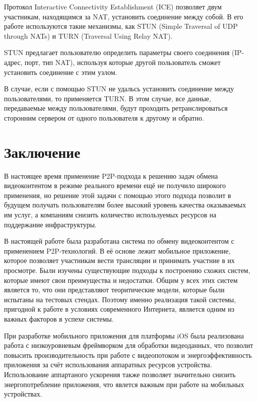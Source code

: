 		Протокол Interactive Connectivity Establishment (ICE) позволяет двум участникам, находящимся за NAT, установить
		соединение между собой. В его работе используются такие механизмы, как STUN (Simple Traversal of UDP
		through NATs) и TURN (Traversal Using Relay NAT).

		STUN предлагает пользователю определить параметры своего соединения (IP-адрес, порт, тип NAT), используя которые
		другой пользователь сможет установить соединение с этим узлом.

		В случае, если с помощью STUN не удальсь установить соединение между пользователями, то применяется TURN. В этом
		случае, все данные, передаваемые между пользователями, будут проходить ретранслироваться сторонним сервером от
		одного пользователя к другому и обратно.

\section*{Заключение}
	В настоящее время применение P2P-подхода к решению задач обмена видеоконтентом в режиме реального времени ещё не
	получило широкого применения, но решение этой задачи с помощью этого подхода позволит в будущем получать
	пользователям более высокий уровень качества оказываемых им услуг, а компаниям снизить количество используемых
	ресурсов на поддержание инфраструктуры.

	В настоящей работе была разработана система по обмену видеоконтентом с применением P2P-технологий. В её основе лежит
	мобильное приложение, которое позволяет участникам вести трансляции и принимать участние в их просмотре. Были
	изучены существующие подходы к построению схожих систем, которые имеют свои преимущества и недостатки. Общим у всех
	этих систем является то, что они представляют теоритические модели, которые были испытаны на тестовых стендах.
	Поэтому именно реализация такой системы, пригодной к работе в условиях современного Интернета, является одним из
	важных факторов в успехе системы.

	При разработке мобильного приложения для платформы iOS была реализована работа с низкоуровневым фреймворком для
	обработки видеоданных, что позволит повысить производительность при работе с видеопотоком и энергоэффективность
	приложения за счёт использования аппаратных ресурсов устройства. Использование аппартаного ускорения также позволяет
	значительно снизить энергопотребление приложения, что явлется важным при работе на мобильных устройствах.

